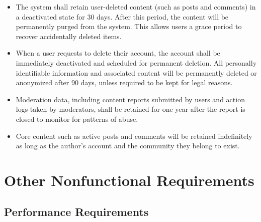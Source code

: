 \documentclass{scrreprt}
\begin{document}
\begin{itemize}[leftmargin=2cm]

    \item[\textbf{DI-1:}] The system shall retain user-deleted content (such as posts and comments) in a deactivated state for 30 days. After this period, the content will be permanently purged from the system. This allows users a grace period to recover accidentally deleted items.

    \item[\textbf{DI-2:}] When a user requests to delete their account, the account shall be immediately deactivated and scheduled for permanent deletion. All personally identifiable information and associated content will be permanently deleted or anonymized after 90 days, unless required to be kept for legal reasons.

    \item[\textbf{DI-3:}] Moderation data, including content reports submitted by users and action logs taken by moderators, shall be retained for one year after the report is closed to monitor for patterns of abuse.

    \item[\textbf{DI-4:}] Core content such as active posts and comments will be retained indefinitely as long as the author's account and the community they belong to exist.

\end{itemize}

\chapter{Other Nonfunctional Requirements}

\section{Performance Requirements}
\end{document}
